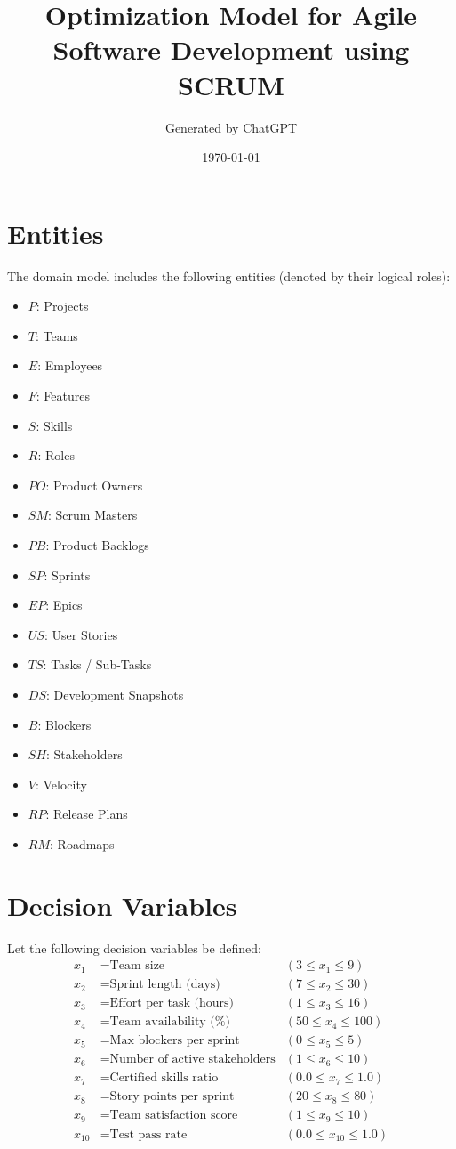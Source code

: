 \documentclass{article}
\title{Optimization Model for Agile Software Development using SCRUM}
\author{Generated by ChatGPT}
\date{\today}
\begin{document}
\maketitle

\section*{Entities}
The domain model includes the following entities (denoted by their logical roles):

\begin{itemize}
  \item $P$: Projects
  \item $T$: Teams
  \item $E$: Employees
  \item $F$: Features
  \item $S$: Skills
  \item $R$: Roles
  \item $PO$: Product Owners
  \item $SM$: Scrum Masters
  \item $PB$: Product Backlogs
  \item $SP$: Sprints
  \item $EP$: Epics
  \item $US$: User Stories
  \item $TS$: Tasks / Sub-Tasks
  \item $DS$: Development Snapshots
  \item $B$: Blockers
  \item $SH$: Stakeholders
  \item $V$: Velocity
  \item $RP$: Release Plans
  \item $RM$: Roadmaps
\end{itemize}

\section*{Decision Variables}
Let the following decision variables be defined:
\begin{align*}
x_1 &= \text{Team size} & (3 \leq x_1 \leq 9) \\
x_2 &= \text{Sprint length (days)} & (7 \leq x_2 \leq 30) \\
x_3 &= \text{Effort per task (hours)} & (1 \leq x_3 \leq 16) \\
x_4 &= \text{Team availability (\%)} & (50 \leq x_4 \leq 100) \\
x_5 &= \text{Max blockers per sprint} & (0 \leq x_5 \leq 5) \\
x_6 &= \text{Number of active stakeholders} & (1 \leq x_6 \leq 10) \\
x_7 &= \text{Certified skills ratio} & (0.0 \leq x_7 \leq 1.0) \\
x_8 &= \text{Story points per sprint} & (20 \leq x_8 \leq 80) \\
x_9 &= \text{Team satisfaction score} & (1 \leq x_9 \leq 10) \\
x_{10} &= \text{Test pass rate} & (0.0 \leq x_{10} \leq 1.0)
\end{align*}
\end{document}
